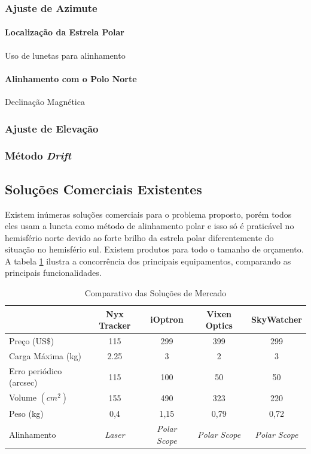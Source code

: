 \subsubsection{Ajuste de Azimute}

\paragraph{Localização da Estrela Polar}
Uso de lunetas para alinhamento

\paragraph{Alinhamento com o Polo Norte}
Declinação Magnética

\subsubsection{Ajuste de Elevação}

\subsubsection{Método \textit{Drift}}

\subsection{Soluções Comerciais Existentes}

Existem inúmeras soluções comerciais para o problema proposto, porém todos eles usam a luneta como método de alinhamento polar e isso só é praticável no hemisfério norte devido ao forte brilho da estrela polar diferentemente do situação no hemisfério sul. Existem produtos para todo o tamanho de orçamento. A tabela \ref{tabela_benchmark} ilustra a concorrência dos principais equipamentos, comparando as principais funcionalidades. 

\begin{table}[htb]
	\caption{Comparativo das Soluções de Mercado}
	\begin{tabular}{l|cccc}
		& Nyx Tracker & iOptron & Vixen Optics & SkyWatcher \\ \hline
		Preço (US\$) & 115 & 299 & 399 & 299 \\\hline
		Carga Máxima (kg) & 2.25 & 3 & 2 & 3 \\\hline
		Erro periódico (arcsec) & 115 & 100 & 50 & 50 \\\hline
		Volume $ (cm^2) $ & 155 & 490 & 323 & 220 \\\hline
		Peso (kg) & 0,4 & 1,15 & 0,79 & 0,72 \\\hline
		Alinhamento & \textit{Laser} & \textit{Polar Scope} & \textit{Polar Scope} & \textit{Polar Scope} \\
	\end{tabular}
	\label{tabela_benchmark}
\end{table}

